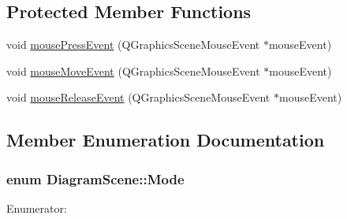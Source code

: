 \subsection*{Protected Member Functions}
\begin{DoxyCompactItemize}
\item 
void \hyperlink{class_diagram_scene_a56249136dab559afa4f840a5c92acf73}{mousePressEvent} (QGraphicsSceneMouseEvent $\ast$mouseEvent)
\item 
void \hyperlink{class_diagram_scene_a4c0f6af69a806c55da083a110a4eb820}{mouseMoveEvent} (QGraphicsSceneMouseEvent $\ast$mouseEvent)
\item 
void \hyperlink{class_diagram_scene_a361512439a7cf2bcd0388c78eb1bb301}{mouseReleaseEvent} (QGraphicsSceneMouseEvent $\ast$mouseEvent)
\end{DoxyCompactItemize}


\subsection{Member Enumeration Documentation}
\hypertarget{class_diagram_scene_a77383a13f4ef28e6617558b1cd5ea52d}{
\subsubsection[{Mode}]{\setlength{\rightskip}{0pt plus 5cm}enum {\bf DiagramScene::Mode}}}
\label{class_diagram_scene_a77383a13f4ef28e6617558b1cd5ea52d}
\begin{Desc}
\item[Enumerator: ]\par
\begin{description}
\item[{\em 
\hypertarget{class_diagram_scene_a77383a13f4ef28e6617558b1cd5ea52da93c81e7a22dfeed5c91a4eaa8b8591fe}{
InsertItem}
\label{class_diagram_scene_a77383a13f4ef28e6617558b1cd5ea52da93c81e7a22dfeed5c91a4eaa8b8591fe}
}]\item[{\em 
\hypertarget{class_diagram_scene_a77383a13f4ef28e6617558b1cd5ea52da277ff8078362c3ebdd47fd67d77d7210}{
InsertLine}
\label{class_diagram_scene_a77383a13f4ef28e6617558b1cd5ea52da277ff8078362c3ebdd47fd67d77d7210}
}]\item[{\em 
\hypertarget{class_diagram_scene_a77383a13f4ef28e6617558b1cd5ea52da4b36b9ff2d2068613991a9ad49307e40}{
MoveItem}
\label{class_diagram_scene_a77383a13f4ef28e6617558b1cd5ea52da4b36b9ff2d2068613991a9ad49307e40}
}]\end{description}
\end{Desc}




